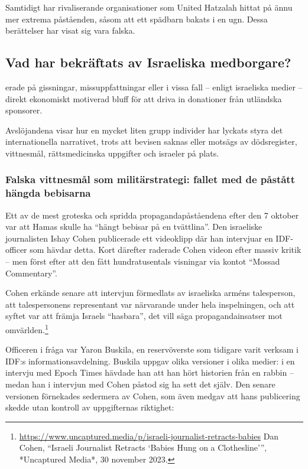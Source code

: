 Samtidigt har rivaliserande organisationer som United Hatzalah hittat på ännu mer extrema påståenden, såsom att ett spädbarn bakats i en ugn. Dessa berättelser har visat sig vara falska.


\subsection{Vad har bekräftats av Israeliska medborgare?}
erade på gissningar, missuppfattningar eller i vissa fall – enligt israeliska medier – direkt ekonomiskt motiverad bluff för att driva in donationer från utländska sponsorer.

Avslöjandena visar hur en mycket liten grupp individer har lyckats styra det internationella narrativet, trots att bevisen saknas eller motsägs av dödsregister, vittnesmål, rättsmedicinska uppgifter och israeler på plats.

\subsubsection*{Falska vittnesmål som militärstrategi: fallet med de påstått hängda bebisarna}

Ett av de mest groteska och spridda propagandapåståendena efter den 7 oktober var att Hamas skulle ha “hängt bebisar på en tvättlina”. Den israeliske journalisten Ishay Cohen publicerade ett videoklipp där han intervjuar en IDF-officer som hävdar detta. Kort därefter raderade Cohen videon efter massiv kritik – men först efter att den fått hundratusentals visningar via kontot “Mossad Commentary”.

Cohen erkände senare att intervjun förmedlats av israeliska arméns talesperson, att talespersonens representant var närvarande under hela inspelningen, och att syftet var att främja Israels “hasbara”, det vill säga propagandainsatser mot omvärlden.\footnote{\url{https://www.uncaptured.media/p/israeli-journalist-retracts-babies} Dan Cohen, “Israeli Journalist Retracts ‘Babies Hung on a Clothesline’”, *Uncaptured Media*, 30 november 2023.}

Officeren i fråga var Yaron Buskila, en reservöverste som tidigare varit verksam i IDF:s informationsavdelning. Buskila uppgav olika versioner i olika medier: i en intervju med Epoch Times hävdade han att han hört historien från en rabbin – medan han i intervjun med Cohen påstod sig ha sett det själv. Den senare versionen förnekades sedermera av Cohen, som även medgav att hans publicering skedde utan kontroll av uppgifternas riktighet: 

